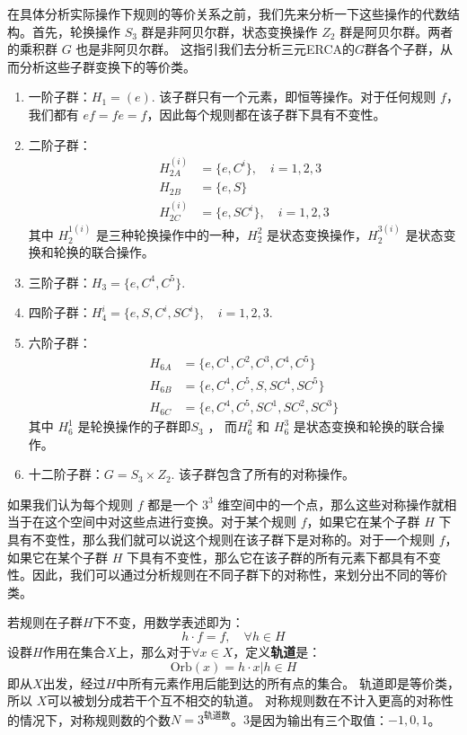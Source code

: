 \documentclass[reprint, amsmath, amssymb, aps, physrev,prb]{revtex4-2}
\begin{document}
在具体分析实际操作下规则的等价关系之前，我们先来分析一下这些操作的代数结构。首先，轮换操作 $S_3$ 群是非阿贝尔群，状态变换操作 $Z_2$ 群是阿贝尔群。两者的乘积群 $G$ 也是非阿贝尔群。
这指引我们去分析三元ERCA的$G$群各个子群，从而分析这些子群变换下的等价类。
\begin{enumerate}
    \item 一阶子群：$H_1 = (e)$. 该子群只有一个元素，即恒等操作。对于任何规则 $f$，我们都有 $ef = fe = f$，因此每个规则都在该子群下具有不变性。
    \item 二阶子群：
    \begin{equation*}
        \begin{aligned}
        H_{2A}^{(i)} &= \{e, C^i\}, \quad i = 1, 2, 3  \\
        H_{2B} &= \{e, S\}  \\
        H_{2C}^{(i)} &= \{e, SC^i\}, \quad i = 1, 2, 3 
    \end{aligned}
    \end{equation*}
    其中 $H_2^{1(i)}$ 是三种轮换操作中的一种，$H_2^2$ 是状态变换操作，$H_2^{3(i)}$ 是状态变换和轮换的联合操作。
    \item 三阶子群：$H_3 = \{e, C^4 , C^5\}$. 
    \item 四阶子群：$H_4^{i} = \{e, S, C^i, SC^i\}, \quad i = 1, 2, 3$. 
    \item 六阶子群：
    \begin{equation*}
        \begin{aligned}
        H_{6A} &= \{e, C^1, C^2, C^3, C^4, C^5\}  \\
        H_{6B} &= \{e, C^4, C^5, S, SC^4, SC^5\} \\
        H_{6C} &= \{e, C^4, C^5, SC^1, SC^2, SC^3\}
        \end{aligned}
    \end{equation*}
    其中 $H_6^1$ 是轮换操作的子群即$S_3$ ， 而$H_6^2$ 和 $H_6^3$ 是状态变换和轮换的联合操作。
    \item 十二阶子群：$G = S_3 \times Z_2$. 该子群包含了所有的对称操作。
\end{enumerate}
如果我们认为每个规则 $f$ 都是一个 $3^3$ 维空间中的一个点，那么这些对称操作就相当于在这个空间中对这些点进行变换。对于某个规则 $f$，如果它在某个子群 $H$ 下具有不变性，那么我们就可以说这个规则在该子群下是对称的。对于一个规则 $f$，如果它在某个子群 $H$ 下具有不变性，那么它在该子群的所有元素下都具有不变性。因此，我们可以通过分析规则在不同子群下的对称性，来划分出不同的等价类。

若规则在子群$H$下不变，用数学表述即为：
\begin{equation}
    h \cdot f = f , \quad \forall h \in H
\end{equation}
设群$H$作用在集合$X$上，那么对于$\forall x \in X$，定义\textbf{轨道}是：
\begin{equation}
    \text{Orb}(x) = {h \cdot x | h \in H}
\end{equation}
即从$X$出发，经过$H$中所有元素作用后能到达的所有点的集合。
轨道即是等价类，所以 $X$可以被划分成若干个互不相交的轨道。
对称规则数在不计入更高的对称性的情况下，对称规则数的个数$N = 3^{\text{轨道数}}$。$3$是因为输出有三个取值：${-1 , 0 ,1}$。
\end{document}
